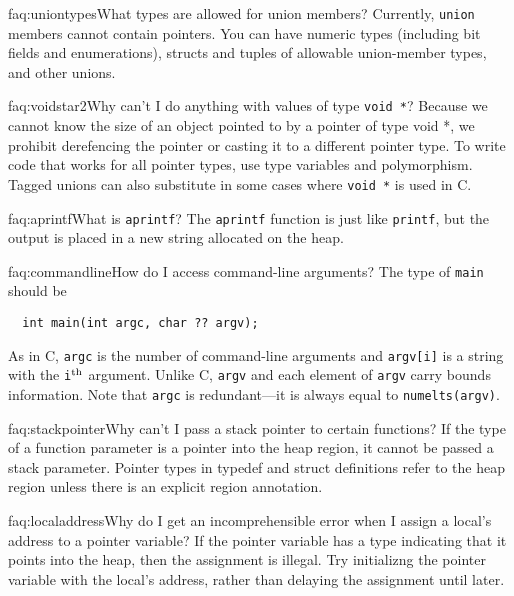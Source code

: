 \begin{faqa}{faq:uniontypes}{What types are allowed for union members?}
Currently, \texttt{union} members cannot contain pointers.  You can
have numeric types (including bit fields and enumerations), structs
and tuples of allowable union-member types, and other unions.
\end{faqa}

\begin{faqa}{faq:voidstar2}{Why can't I do anything with values of type \texttt{void *}?}
Because we cannot know the size of an object pointed to by a pointer
of type void *, we prohibit derefencing the pointer or casting it to a
different pointer type.  To write code that works for all pointer
types, use type variables and polymorphism.  Tagged unions can also
substitute in some cases where \texttt{void *} is used in C\@.
\end{faqa}

\begin{faqa}{faq:aprintf}{What is \texttt{aprintf}?}
The \texttt{aprintf} function is just like \texttt{printf}, but
the output is placed in a new string allocated on the heap.
\end{faqa}

\begin{faqa}{faq:commandline}{How do I access command-line arguments?}
The type of \texttt{main} should be
\begin{verbatim}
  int main(int argc, char ?? argv);
\end{verbatim}
As in C, \texttt{argc} is the number of command-line arguments and
\texttt{argv[i]} is a string with the \texttt{i}$^{\rm th}$ argument.
Unlike C, \texttt{argv} and each element of \texttt{argv} carry bounds
information.  Note that \texttt{argc} is redundant---it is always
equal to \texttt{numelts(argv)}.
\end{faqa}

\begin{faqa}{faq:stackpointer}{Why can't I pass a stack pointer to certain functions?}
If the type of a function parameter is a pointer into the heap region,
it cannot be passed a stack parameter.  Pointer types in typedef and
struct definitions refer to the heap region unless there is an
explicit region annotation.
\end{faqa}

\begin{faqa}{faq:localaddress}{Why do I get an incomprehensible error when I assign a local's address to a pointer variable?}
If the pointer variable has a type indicating that it points into the
heap, then the assignment is illegal.  Try initializng the pointer variable
with the local's address, rather than delaying the assignment until later.
\end{faqa}

